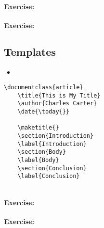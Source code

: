         \paragraph{Exercise:}

        \paragraph{Exercise:}


        \subsection{Templates}
        \label{Templates}
        
        \begin{framed}
            \begin{itemize}
                \item{}
            \end{itemize}
        \end{framed}


        \begin{verbatim}
\documentclass{article}
    \title{This is My Title}
    \author{Charles Carter}
    \date{\today{}}
 
    \maketitle{}
    \section{Introduction}
    \label{Introduction}
    \section{Body}
    \label{Body}
    \section{Conclusion}
    \label{Conclusion}
    
        \end{verbatim}

        \paragraph{Exercise:}

        \paragraph{Exercise:}


